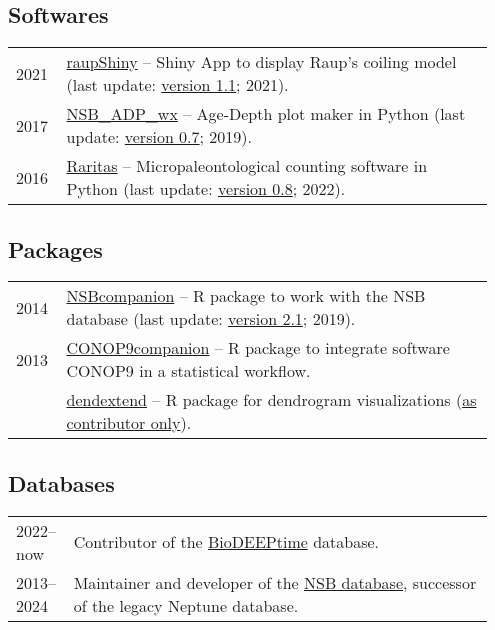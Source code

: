 \documentclass[11pt, a4paper]{article}
\begin{document}
\subsection{Softwares}
\begin{longtable}{@{}p{0.1\linewidth} >{\small}P{0.85\linewidth}@{}}
2021 & \href{http://github.com/plannapus/raupShiny/releases}{raupShiny} -- Shiny App to display Raup's coiling model (last update: \href{https://doi.org/10.5281/zenodo.5171827}{version 1.1}; 2021).\\
2017 & \href{http://github.com/plannapus/NSB_ADP_wx/releases}{NSB\_ADP\_wx} -- Age-Depth plot maker in Python (last update: \href{http://doi.org/10.5281/zenodo.3408657}{version 0.7}; 2019).\\
2016 & \href{http://github.com/plannapus/Raritas/releases}{Raritas} -- Micropaleontological counting software in Python (last update: \href{https://github.com/plannapus/Raritas/releases/tag/v0.8}{version 0.8}; 2022).\\
\end{longtable}
\subsection{Packages}
\begin{longtable}{@{}p{0.1\linewidth} >{\small}P{0.85\linewidth}@{}}
2014 & \href{http://github.com/plannapus/NSBcompanion}{NSBcompanion} -- R package to work with the NSB database (last update: \href{http://doi.org/10.5281/zenodo.3408198}{version 2.1}; 2019).\\
2013 & \href{http://github.com/plannapus/CONOP9companion}{CONOP9companion} -- R package to integrate software CONOP9 in a statistical workflow.\\
     & \href{https://cran.r-project.org/web/packages/dendextend/index.html}{dendextend} -- R package for dendrogram visualizations (\underline{as contributor only}).\\
\end{longtable}
\subsection{Databases}
\begin{longtable}{@{}p{0.1\linewidth} >{\small}P{0.85\linewidth}@{}}
2022--now & Contributor of the \href{https://zenodo.org/record/7504616}{BioDEEPtime} database.\\
2013--2024 & Maintainer and developer of the \href{http://nsb-mfn-berlin.de/}{NSB database}, successor of the legacy Neptune database.\\
\end{longtable}
\end{document}
